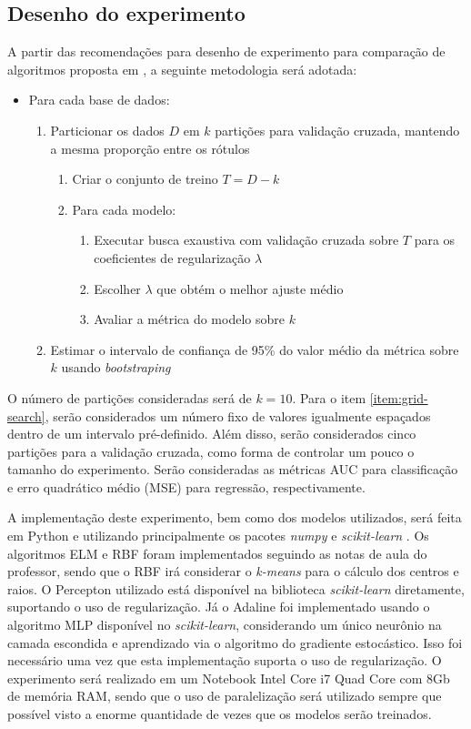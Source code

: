 \documentclass[conference]{IEEEtran}
\begin{document}
	\subsection{Desenho do experimento}
	A partir das recomendações para desenho de experimento para comparação de algoritmos proposta em \cite{salzberg1997comparing}, a seguinte metodologia será adotada:
	\begin{itemize}
		\item Para cada base de dados:
			\begin{enumerate}
			\item Particionar os dados $D$ em $k$ partições para validação cruzada, mantendo a mesma proporção entre os rótulos
			\begin{enumerate}
				\item Criar o conjunto de treino $T = D - k$
				\item Para cada modelo:
				\begin{enumerate}
					\item Executar busca exaustiva com validação cruzada sobre $T$ para os coeficientes de regularização $\lambda$ \label{item:grid-search}
					\item Escolher $\lambda$ que obtém o melhor ajuste médio 
					\item Avaliar a métrica do modelo sobre $k$
				\end{enumerate}
			\end{enumerate}
			\item Estimar o intervalo de confiança de 95\% do valor médio da métrica sobre $k$ usando \textit{bootstraping}
		\end{enumerate}
	\end{itemize}
	
	O número de partições consideradas será de $k=10$. Para o item \ref{item:grid-search}, serão considerados um número fixo de valores igualmente espaçados  dentro de um intervalo pré-definido. Além disso, serão considerados cinco partições para a validação cruzada, como forma de controlar um pouco o tamanho do experimento. Serão consideradas as métricas AUC para classificação e erro quadrático médio (MSE) para regressão, respectivamente.
	
	A implementação deste experimento, bem como dos modelos utilizados, será feita em Python e utilizando principalmente os pacotes \textit{numpy} \cite{harris2020array} e \textit{scikit-learn} \cite{scikit-learn}. Os algoritmos ELM e RBF foram implementados seguindo as notas de aula do professor, sendo que o RBF irá considerar o \textit{k-means} para o cálculo dos centros e raios. O Percepton utilizado está disponível na biblioteca \textit{scikit-learn} diretamente, suportando o uso de regularização. Já o Adaline foi implementado usando o algoritmo MLP disponível no \textit{scikit-learn}, considerando um único neurônio na camada escondida e aprendizado via o algoritmo do gradiente estocástico. Isso foi necessário uma vez que esta implementação suporta o uso de regularização. O experimento será realizado em um Notebook Intel Core i7 Quad Core com 8Gb de memória RAM, sendo que o uso de paralelização será utilizado sempre que possível visto a enorme quantidade de vezes que os modelos serão treinados.
	
\end{document}
